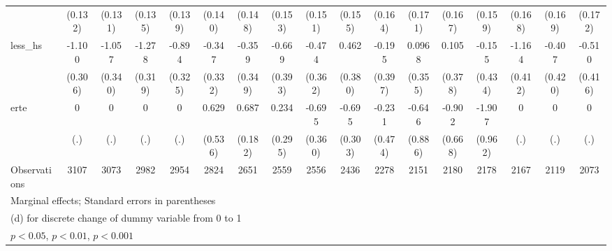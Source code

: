 {\begin{tabular}{l*{16}{c}}
                    &     (0.132)         &     (0.131)         &     (0.135)         &     (0.139)         &     (0.140)         &     (0.148)         &     (0.153)         &     (0.151)         &     (0.155)         &     (0.164)         &     (0.171)         &     (0.167)         &     (0.159)         &     (0.168)         &     (0.169)         &     (0.172)         \\
[1em]
less\_hs             &      -1.100\sym{***}&      -1.057\sym{**} &      -1.278\sym{***}&      -0.894\sym{**} &      -0.347         &      -0.359         &      -0.669         &      -0.474         &       0.462         &      -0.195         &      0.0968         &       0.105         &      -0.155         &      -1.164\sym{**} &      -0.407         &      -0.510         \\
                    &     (0.306)         &     (0.340)         &     (0.319)         &     (0.325)         &     (0.332)         &     (0.349)         &     (0.393)         &     (0.362)         &     (0.380)         &     (0.397)         &     (0.355)         &     (0.378)         &     (0.434)         &     (0.412)         &     (0.420)         &     (0.416)         \\
[1em]
erte                &           0         &           0         &           0         &           0         &       0.629         &       0.687\sym{***}&       0.234         &      -0.695         &      -0.695\sym{*}  &      -0.231         &      -0.646         &      -0.902         &      -1.907\sym{*}  &           0         &           0         &           0         \\
                    &         (.)         &         (.)         &         (.)         &         (.)         &     (0.536)         &     (0.182)         &     (0.295)         &     (0.360)         &     (0.303)         &     (0.474)         &     (0.886)         &     (0.668)         &     (0.962)         &         (.)         &         (.)         &         (.)         \\
\hline
Observations        &        3107         &        3073         &        2982         &        2954         &        2824         &        2651         &        2559         &        2556         &        2436         &        2278         &        2151         &        2180         &        2178         &        2167         &        2119         &        2073         \\
\hline\hline
\multicolumn{17}{l}{\footnotesize Marginal effects; Standard errors in parentheses}\\
\multicolumn{17}{l}{\footnotesize  (d) for discrete change of dummy variable from 0 to 1}\\
\multicolumn{17}{l}{\footnotesize \sym{*} \(p<0.05\), \sym{**} \(p<0.01\), \sym{***} \(p<0.001\)}\\
\end{tabular}
}
